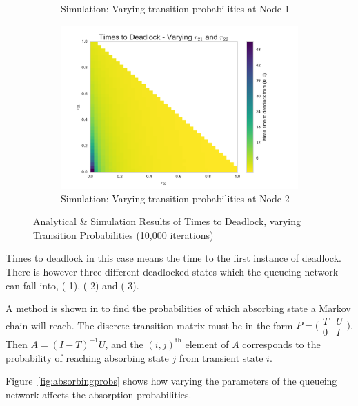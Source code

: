 \documentclass{article}
\begin{document}
\begin{figure}[!htbp]
\begin{subfigure}[b]{0.5\textwidth}
  \caption{Simulation: Varying transition probabilities at Node 1}
  \label{fig:heatmap_sim_1}
\end{subfigure}
\begin{subfigure}[b]{0.5\textwidth}
  \includegraphics[width=\textwidth]{images/N2_heatmap_sim}
  \caption{Simulation: Varying transition probabilities at Node 2}
  \label{fig:heatmap_sim_2}
\end{subfigure}
\caption{Analytical \& Simulation Results of Times to Deadlock, varying Transition Probabilities (10,000 iterations)}
\label{fig:heatmaps}
\end{figure}

Times to deadlock in this case means the time to the first instance of deadlock.
There is however three different deadlocked states which the queueing network can fall into, (-1), (-2) and (-3).

A method is shown in \cite{stewart09} to find the probabilities of which absorbing state a Markov chain will reach.
The discrete transition matrix must be in the form $P = \bigl(\begin{smallmatrix} T & U\\ 0 & I \end{smallmatrix} \bigr)$.
Then $A = (I - T)^{-1}U$, and the $(i, j)^{\text{th}}$ element of $A$ corresponds to the probability of reaching absorbing state $j$ from transient state $i$.

Figure~\ref{fig:absorbingprobs} shows how varying the parameters of the queueing network affects the absorption probabilities.
\end{document}
